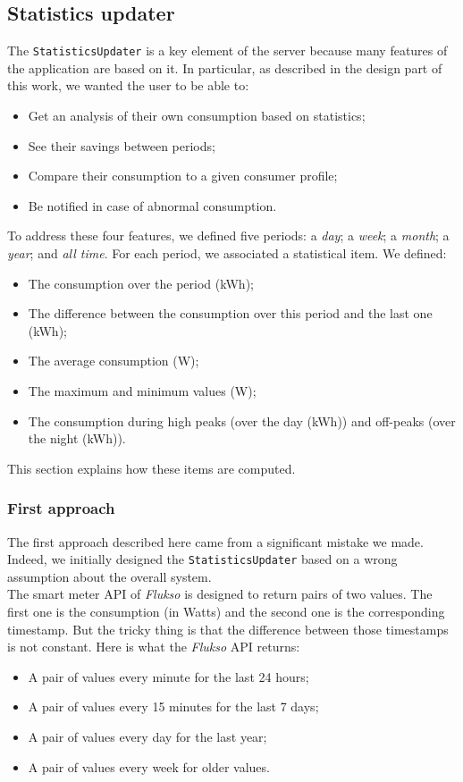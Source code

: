\documentclass[a4paper, oneside, 11pt]{book}
\begin{document}
\subsection{Statistics updater}
The \texttt{StatisticsUpdater} is a key element of the server because many features of the application are based on it. In particular, as described in the design part of this work, we wanted the user to be able to: 

\begin{itemize}
	\item Get an analysis of their own consumption based on statistics;
	\item See their savings between periods;
	\item Compare their consumption to a given consumer profile;
	\item Be notified in case of abnormal consumption. 
\end{itemize}

To address these four features, we defined five periods: a \emph{day}; a \emph{week}; a \emph{month}; a \emph{year}; and \emph{all time}. For each period, we associated a statistical item. We defined:

\begin{itemize}
	\item The consumption over the period (kWh);
	\item The difference between the consumption over this period and the last one (kWh);
	\item The average consumption (W);
	\item The maximum and minimum values (W);
	\item The consumption during high peaks (over the day (kWh)) and off-peaks (over the night (kWh)).
\end{itemize}

This section explains how these items are computed.

\subsubsection{First approach}
The first approach described here came from a significant mistake we made. Indeed, we initially designed the \texttt{StatisticsUpdater} based on a wrong assumption about the overall system. \\

The smart meter API of \textit{Flukso} is designed to return pairs of two values. The first one is the consumption (in Watts) and the second one is the corresponding timestamp. But the tricky thing is that the difference between those timestamps is not constant. Here is what the \textit{Flukso} API returns:
\begin{itemize}
	\item A pair of values every minute for the last 24 hours;
	\item A pair of values every 15 minutes for the last 7 days;
	\item A pair of values every day for the last year;
	\item A pair of values every week for older values.
\end{itemize}
\end{document}
